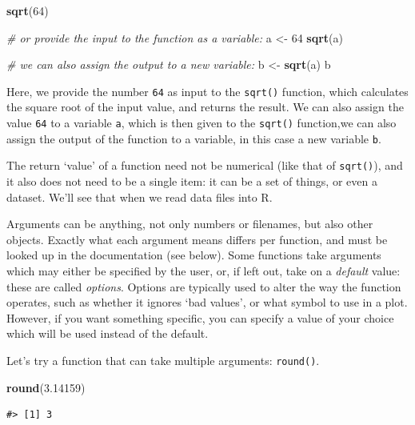 \documentclass[
]{book}
\newenvironment{Shaded}{\begin{snugshade}}{\end{snugshade}}
\newcommand{\CommentTok}[1]{\textcolor[rgb]{0.56,0.35,0.01}{\textit{#1}}}
\newcommand{\DecValTok}[1]{\textcolor[rgb]{0.00,0.00,0.81}{#1}}
\newcommand{\FloatTok}[1]{\textcolor[rgb]{0.00,0.00,0.81}{#1}}
\newcommand{\FunctionTok}[1]{\textcolor[rgb]{0.13,0.29,0.53}{\textbf{#1}}}
\newcommand{\NormalTok}[1]{#1}
\newcommand{\OtherTok}[1]{\textcolor[rgb]{0.56,0.35,0.01}{#1}}
\begin{document}
\begin{Shaded}
\begin{Highlighting}[]
\FunctionTok{sqrt}\NormalTok{(}\DecValTok{64}\NormalTok{)}

\CommentTok{\# or provide the input to the function as a variable:}
\NormalTok{a }\OtherTok{\textless{}{-}} \DecValTok{64}
\FunctionTok{sqrt}\NormalTok{(a)}

\CommentTok{\# we can also assign the output to a new variable:}
\NormalTok{b }\OtherTok{\textless{}{-}} \FunctionTok{sqrt}\NormalTok{(a)}
\NormalTok{b}
\end{Highlighting}
\end{Shaded}

Here, we provide the number \texttt{64} as input to the \texttt{sqrt()} function, which
calculates the square root of the input value, and returns the result. We can also assign the value \texttt{64} to a variable \texttt{a}, which is then given to the \texttt{sqrt()} function,we can also assign the output of the function to a variable, in this case a new variable \texttt{b}.

The return `value' of a function need not be numerical (like that of \texttt{sqrt()}),
and it also does not need to be a single item: it can be a set of things, or
even a dataset. We'll see that when we read data files into R.

Arguments can be anything, not only numbers or filenames, but also other
objects. Exactly what each argument means differs per function, and must be
looked up in the documentation (see below). Some functions take arguments which
may either be specified by the user, or, if left out, take on a \emph{default} value:
these are called \emph{options}. Options are typically used to alter the way the
function operates, such as whether it ignores `bad values', or what symbol to
use in a plot. However, if you want something specific, you can specify a value
of your choice which will be used instead of the default.

Let's try a function that can take multiple arguments: \texttt{round()}.

\begin{Shaded}
\begin{Highlighting}[]
\FunctionTok{round}\NormalTok{(}\FloatTok{3.14159}\NormalTok{)}
\end{Highlighting}
\end{Shaded}

\begin{verbatim}
#> [1] 3
\end{verbatim}
\end{document}
